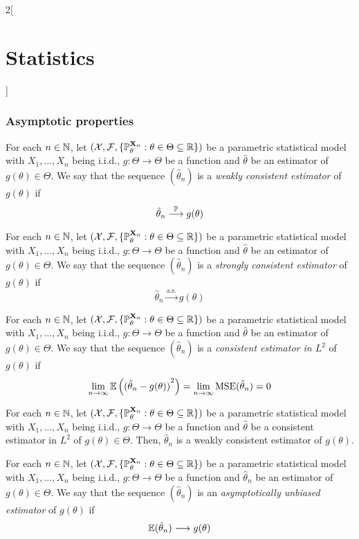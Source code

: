 \documentclass[../../../main.tex]{subfiles}
\begin{document}
\begin{multicols}{2}[\section{Statistics}]
  \subsubsection{Asymptotic properties}
  \begin{definition}
    For each $n\in\mathbb{N}$, let $(\mathcal{X},\mathcal{F},\{\mathbb{P}_{\theta}^{\boldsymbol{\mathrm{X}}_n}:\theta\in\Theta\subseteq \mathbb{R}\})$ be a parametric statistical model with $X_1,\ldots,X_n$ being i.i.d., $g:\Theta\rightarrow\Theta$ be a function and ${\hat\theta}$ be an estimator of $g({\theta})\in\Theta$. We say that the sequence $({{\hat\theta}}_n)$ is a \emph{weakly consistent estimator} of $g(\theta)$ if $${{\hat\theta}}_n\overset{\mathbb{P}}{\longrightarrow}g(\theta)$$
  \end{definition}
  \begin{definition}
    For each $n\in\mathbb{N}$, let $(\mathcal{X},\mathcal{F},\{\mathbb{P}_{\theta}^{\boldsymbol{\mathrm{X}}_n}:\theta\in\Theta\subseteq \mathbb{R}\})$ be a parametric statistical model with $X_1,\ldots,X_n$ being i.i.d., $g:\Theta\rightarrow\Theta$ be a function and ${\hat\theta}$ be an estimator of $g({\theta})\in\Theta$. We say that the sequence $({{\hat\theta}}_n)$ is a \emph{strongly consistent estimator} of $g(\theta)$ if $${{\hat\theta}}_n\overset{\text{a.s.}}{\longrightarrow}g(\theta)$$
  \end{definition}
  \begin{definition}
    For each $n\in\mathbb{N}$, let $(\mathcal{X},\mathcal{F},\{\mathbb{P}_{\theta}^{\boldsymbol{\mathrm{X}}_n}:\theta\in\Theta\subseteq \mathbb{R}\})$ be a parametric statistical model with $X_1,\ldots,X_n$ being i.i.d., $g:\Theta\rightarrow\Theta$ be a function and ${\hat\theta}$ be an estimator of $g({\theta})\in\Theta$. We say that the sequence $({{\hat\theta}}_n)$ is a \emph{consistent estimator in $L^2$} of $g(\theta)$ if $$\lim_{n\to\infty}\mathbb{E}\left({({\hat\theta}_n-g({\theta}))}^2\right)=\lim_{n\to\infty}\operatorname{MSE}({\hat\theta}_n)=0$$
  \end{definition}
  \begin{proposition}
    For each $n\in\mathbb{N}$, let $(\mathcal{X},\mathcal{F},\{\mathbb{P}_{\theta}^{\boldsymbol{\mathrm{X}}_n}:\theta\in\Theta\subseteq \mathbb{R}\})$ be a parametric statistical model with $X_1,\ldots,X_n$ being i.i.d., $g:\Theta\rightarrow\Theta$ be a function and ${\hat\theta}$ be a consistent estimator in $L^2$ of $g({\theta})\in\Theta$. Then, ${{\hat\theta}}_n$ is a weakly consistent estimator of $g(\theta)$.
  \end{proposition}
  \begin{definition}
    For each $n\in\mathbb{N}$, let $(\mathcal{X},\mathcal{F},\{\mathbb{P}_{\theta}^{\boldsymbol{\mathrm{X}}_n}:\theta\in\Theta\subseteq \mathbb{R}\})$ be a parametric statistical model with $X_1,\ldots,X_n$ being i.i.d., $g:\Theta\rightarrow\Theta$ be a function and ${{\hat\theta}}_n$ be an estimator of $g(\theta)\in\Theta$. We say that the sequence $({{\hat\theta}}_n)$ is an \emph{asymptotically unbiased estimator} of $g(\theta)$ if $$\mathbb{E}({{\hat\theta}}_n)\longrightarrow g(\theta)$$

\end{definition}
\end{multicols}
\end{document}
